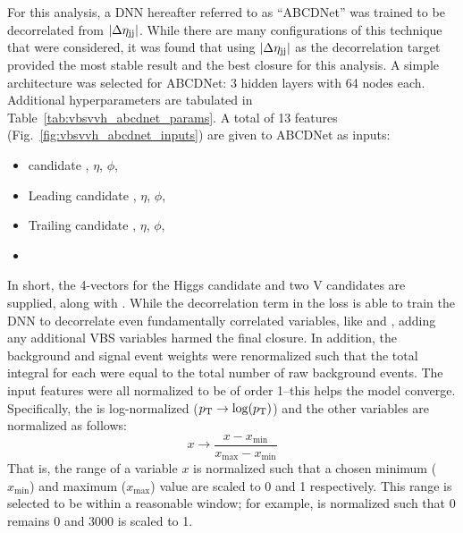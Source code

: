 For this analysis, a DNN hereafter referred to as ``ABCDNet'' was trained to be decorrelated from $|\Delta\eta_{\mathrm{j}\mathrm{j}}|$.
While there are many configurations of this technique that were considered, it was found that using $|\Delta\eta_{\mathrm{j}\mathrm{j}}|$ as the decorrelation target provided the most stable result and the best closure for this analysis. 
A simple architecture was selected for ABCDNet: 3 hidden layers with 64 nodes each. %
Additional hyperparameters are tabulated in Table~\ref{tab:vbsvvh_abcdnet_params}. 
A total of 13 features (Fig.~\ref{fig:vbsvvh_abcdnet_inputs}) are given to ABCDNet as inputs:
\begin{itemize}
    \item \Htobb candidate \pt, $\eta$, $\phi$, \MPNet
    \item Leading \Vtoqq candidate \pt, $\eta$, $\phi$, \MPNet
    \item Trailing \Vtoqq candidate \pt, $\eta$, $\phi$, \MPNet
    \item \Mjj
\end{itemize}
In short, the 4-vectors for the Higgs candidate and two V candidates are supplied, along with \Mjj. 
While the decorrelation term in the loss is able to train the DNN to decorrelate even fundamentally correlated variables, like \Mjj and \detajj, adding any additional VBS variables harmed the final closure. 
In addition, the background and signal event weights were renormalized such that the total integral for each were equal to the total number of raw background events.
The input features were all normalized to be of order 1--this helps the model converge. 
Specifically, the \pt is log-normalized ($p_{\mathrm{T}} \rightarrow \log(p_{\mathrm{T}})$) and the other variables are normalized as follows:
\begin{equation}
    x \rightarrow \frac{x - x_\text{min}}{x_\text{max} - x_\text{min}}
\end{equation}
That is, the range of a variable $x$ is normalized such that a chosen minimum ($x_\text{min}$) and maximum ($x_\text{max}$) value are scaled to 0 and 1 respectively. 
This range is selected to be within a reasonable window; for example, \Mjj is normalized such that 0 remains 0 and 3000 is scaled to 1.

